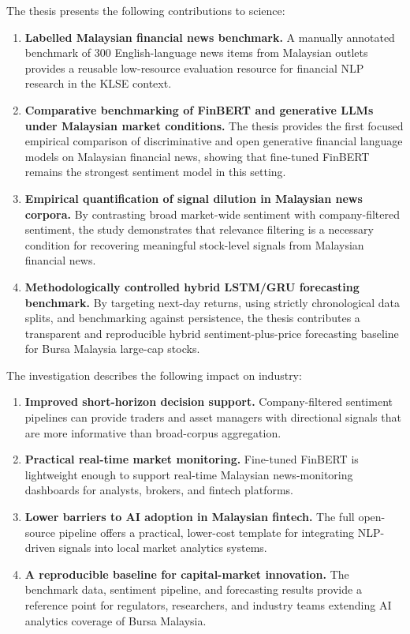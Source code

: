 \documentclass[12pt]{ucetd}
\begin{document}
The thesis presents the following contributions to science:
\begin{enumerate}
    \item \textbf{Labelled Malaysian financial news benchmark.} A manually annotated benchmark of 300 English-language news items from Malaysian outlets provides a reusable low-resource evaluation resource for financial NLP research in the KLSE context.

    \item \textbf{Comparative benchmarking of FinBERT and generative LLMs under Malaysian market conditions.} The thesis provides the first focused empirical comparison of discriminative and open generative financial language models on Malaysian financial news, showing that fine-tuned FinBERT remains the strongest sentiment model in this setting.

    \item \textbf{Empirical quantification of signal dilution in Malaysian news corpora.} By contrasting broad market-wide sentiment with company-filtered sentiment, the study demonstrates that relevance filtering is a necessary condition for recovering meaningful stock-level signals from Malaysian financial news.

    \item \textbf{Methodologically controlled hybrid LSTM/GRU forecasting benchmark.} By targeting next-day returns, using strictly chronological data splits, and benchmarking against persistence, the thesis contributes a transparent and reproducible hybrid sentiment-plus-price forecasting baseline for Bursa Malaysia large-cap stocks.
\end{enumerate}

The investigation describes the following impact on industry:
\begin{enumerate}
    \item \textbf{Improved short-horizon decision support.}
    Company-filtered sentiment pipelines can provide traders and asset managers with directional signals that are more informative than broad-corpus aggregation.

    \item \textbf{Practical real-time market monitoring.}
    Fine-tuned FinBERT is lightweight enough to support real-time Malaysian news-monitoring dashboards for analysts, brokers, and fintech platforms.

    \item \textbf{Lower barriers to AI adoption in Malaysian fintech.}
    The full open-source pipeline offers a practical, lower-cost template for integrating NLP-driven signals into local market analytics systems.

    \item \textbf{A reproducible baseline for capital-market innovation.}
    The benchmark data, sentiment pipeline, and forecasting results provide a reference point for regulators, researchers, and industry teams extending AI analytics coverage of Bursa Malaysia.
\end{enumerate}
\end{document}
